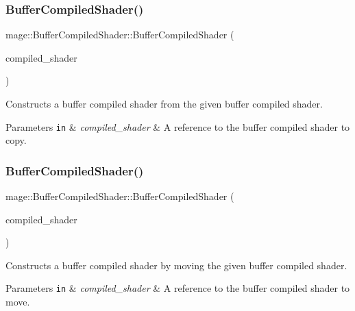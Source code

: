 \subsubsection{\texorpdfstring{Buffer\+Compiled\+Shader()}{BufferCompiledShader()}\hspace{0.1cm}{\footnotesize\ttfamily [2/3]}}
{\footnotesize\ttfamily mage\+::\+Buffer\+Compiled\+Shader\+::\+Buffer\+Compiled\+Shader (\begin{DoxyParamCaption}\item[{const \hyperlink{structmage_1_1_buffer_compiled_shader}{Buffer\+Compiled\+Shader} \&}]{compiled\+\_\+shader }\end{DoxyParamCaption})\hspace{0.3cm}{\ttfamily [default]}}

Constructs a buffer compiled shader from the given buffer compiled shader.


\begin{DoxyParams}[1]{Parameters}
\mbox{\tt in}  & {\em compiled\+\_\+shader} & A reference to the buffer compiled shader to copy. \\
\hline
\end{DoxyParams}
\hypertarget{structmage_1_1_buffer_compiled_shader_a0dad36c9b2c73ad9053d90c8e673d0b1}{}\label{structmage_1_1_buffer_compiled_shader_a0dad36c9b2c73ad9053d90c8e673d0b1} 
\subsubsection{\texorpdfstring{Buffer\+Compiled\+Shader()}{BufferCompiledShader()}\hspace{0.1cm}{\footnotesize\ttfamily [3/3]}}
{\footnotesize\ttfamily mage\+::\+Buffer\+Compiled\+Shader\+::\+Buffer\+Compiled\+Shader (\begin{DoxyParamCaption}\item[{\hyperlink{structmage_1_1_buffer_compiled_shader}{Buffer\+Compiled\+Shader} \&\&}]{compiled\+\_\+shader }\end{DoxyParamCaption})\hspace{0.3cm}{\ttfamily [default]}}

Constructs a buffer compiled shader by moving the given buffer compiled shader.


\begin{DoxyParams}[1]{Parameters}
\mbox{\tt in}  & {\em compiled\+\_\+shader} & A reference to the buffer compiled shader to move. \\
\hline
\end{DoxyParams}
\hypertarget{structmage_1_1_buffer_compiled_shader_a39ca72436bfd68e14c41fead70540edc}{}\label{structmage_1_1_buffer_compiled_shader_a39ca72436bfd68e14c41fead70540edc} 
